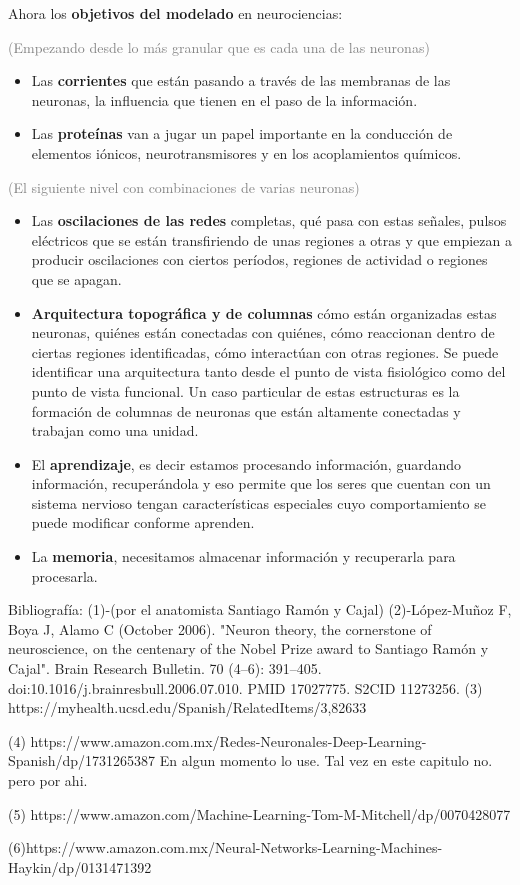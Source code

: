 Ahora los \textbf{objetivos del modelado} en neurociencias:

\textcolor{gray}{(Empezando desde lo más granular que es cada una de las neuronas)}

\begin{itemize}
 \item Las \textbf{corrientes} que están pasando a través de las membranas de las neuronas, la influencia que tienen en el paso de la información. 
 
 \item Las \textbf{proteínas} van a jugar un papel importante en la conducción de elementos iónicos, neurotransmisores y en los acoplamientos químicos.
\end{itemize}

\textcolor{gray}{(El siguiente nivel con combinaciones de varias neuronas)}

\begin{itemize}
 \item Las \textbf{oscilaciones de las redes} completas, qué pasa con estas señales, pulsos eléctricos que se están transfiriendo de unas regiones a otras y que empiezan a producir oscilaciones con ciertos períodos,  regiones de actividad o regiones que se apagan.
 
 \item \textbf{Arquitectura topográfica y de columnas} cómo están organizadas estas neuronas, quiénes están conectadas con quiénes, cómo reaccionan dentro de ciertas regiones identificadas, cómo interactúan con otras regiones. Se puede identificar una arquitectura tanto desde el punto de vista fisiológico como del punto de vista funcional. Un caso particular de estas estructuras es la formación de columnas de neuronas que están altamente conectadas y trabajan como una unidad.
 
 \item El \textbf{aprendizaje}, es decir estamos procesando información, guardando información, recuperándola y eso permite que los seres que cuentan con un sistema nervioso tengan características especiales cuyo comportamiento se puede modificar conforme aprenden. 
 
 \item La \textbf{memoria}, necesitamos almacenar información y recuperarla para procesarla. 
\end{itemize}

Bibliografía:
(1)-(por el anatomista Santiago Ramón y Cajal)
(2)-López-Muñoz F, Boya J, Alamo C (October 2006). "Neuron theory, the cornerstone of neuroscience, on the centenary of the Nobel Prize award to Santiago Ramón y Cajal". Brain Research Bulletin. 70 (4–6): 391–405. doi:10.1016/j.brainresbull.2006.07.010. PMID 17027775. S2CID 11273256.
(3) https://myhealth.ucsd.edu/Spanish/RelatedItems/3,82633

(4) https://www.amazon.com.mx/Redes-Neuronales-Deep-Learning-Spanish/dp/1731265387 En algun momento lo use. Tal vez en este capitulo no. pero por ahi.


(5) https://www.amazon.com/Machine-Learning-Tom-M-Mitchell/dp/0070428077

(6)https://www.amazon.com.mx/Neural-Networks-Learning-Machines-Haykin/dp/0131471392

